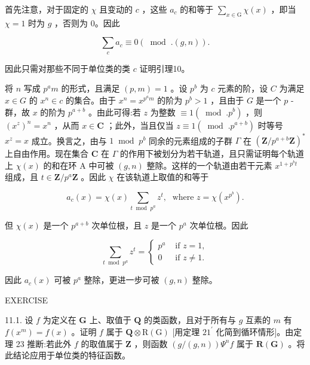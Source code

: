 \documentclass[10pt]{article}
\begin{document}
首先注意，对于固定的 \(\chi\) 且变动的 \(c\) ，这些 \({a}_{c}\) 的和等于 \(\mathop{\sum }\limits_{{x \in  \mathrm{G}}}\chi \left( x\right)\) ，即当 \(\chi  = 1\) 时为 \(g\) ，否则为 0。因此

\[
\mathop{\sum }\limits_{c}{a}_{c} \equiv  0\left( {{\;\operatorname{mod}\;.}\left( {g,n}\right) }\right) .
\]

因此只需对那些不同于单位类的类 \(c\) 证明引理10。

将 \(n\) 写成 \({p}^{a}m\) 的形式，且满足 \(\left( {p,m}\right)  = 1\) 。设 \({p}^{b}\) 为 \(c\) 元素的阶，设 \(C\) 为满足 \(x \in  G\) 的 \({x}^{n} \in  c\) 的集合。由于 \({x}^{n} = {x}^{{p}^{a}m}\) 的阶为 \({p}^{b} > 1\) ，且由于 \(G\) 是一个 \(p\) -群，故 \(x\) 的阶为 \({p}^{a + b}\) 。由此可得:若 \(z\) 为整数 \(\equiv  1\left( {\;\operatorname{mod}\;.{p}^{b}}\right)\) ，则 \({\left( {x}^{z}\right) }^{n} = {x}^{n}\) ，从而 \(x \in  \mathbf{C}\) ；此外，当且仅当 \(z \equiv  1\left( {{\;\operatorname{mod}\;.}{p}^{a + b}}\right)\) 时等号 \({x}^{z} = x\) 成立。换言之，由与 \(1{\;\operatorname{mod}\;{p}^{b}}\) 同余的元素组成的子群 \(\Gamma\) 在 \({\left( \mathbf{Z}/{p}^{a + b}\mathbf{Z}\right) }^{ * }\) 上自由作用。现在集合 \(\mathbf{C}\) 在 \(\Gamma\) 的作用下被划分为若干轨道，且只需证明每个轨道上 \(\chi \left( x\right)\) 的和在环 A 中可被 \(\left( {g,n}\right)\) 整除。这样的一个轨道由若干元素 \({x}^{1 + {p}^{b}t}\) 组成，且 \(t \in  \mathbf{Z}/{p}^{a}\mathbf{Z}\) 。因此 \(\chi\) 在该轨道上取值的和等于

\[
{a}_{c}\left( x\right)  = \chi \left( x\right) \mathop{\sum }\limits_{{t{\;\operatorname{mod}\;{p}^{a}}}}{z}^{t},\;\text{ where }z = \chi \left( {x}^{{p}^{b}}\right) .
\]

但 \(\chi \left( x\right)\) 是一个 \({p}^{a + b}\) 次单位根，且 \(z\) 是一个 \({p}^{a}\) 次单位根。因此

\[
\mathop{\sum }\limits_{{t{\;\operatorname{mod}\;{p}^{a}}}}{z}^{t} = \left\{  \begin{array}{ll} {p}^{a} & \text{ if }z = 1, \\  0 & \text{ if }z \neq  1. \end{array}\right.
\]

因此 \({a}_{c}\left( x\right)\) 可被 \({p}^{a}\) 整除，更进一步可被 \(\left( {g,n}\right)\) 整除。

EXERCISE

11.1. 设 \(f\) 为定义在 \(\mathbf{G}\) 上、取值于 \(\mathbf{Q}\) 的类函数，且对于所有与 \(g\) 互素的 \(m\) 有 \(f\left( {x}^{m}\right)  = f\left( x\right)\) 。证明 \(f\) 属于 \(\mathbf{Q} \otimes  \mathrm{R}\left( \mathrm{G}\right)\) [用定理 \(2{1}^{\prime }\) 化简到循环情形]。由定理 23 推断:若此外 \(f\) 的取值属于 \(\mathbf{Z}\) ，则函数 \(\left( {g/\left( {g,n}\right) }\right) {\Psi }^{n}f\) 属于 \(\mathbf{R}\left( \mathbf{G}\right)\) 。将此结论应用于单位类的特征函数。
\end{document}
